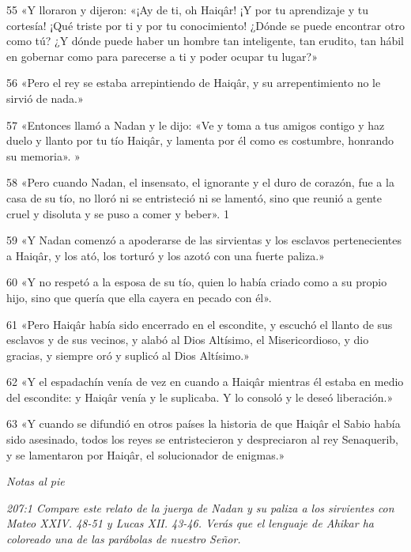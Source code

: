 \par 55 «Y lloraron y dijeron: «¡Ay de ti, oh Haiqâr! ¡Y por tu aprendizaje y tu cortesía! ¡Qué triste por ti y por tu conocimiento! ¿Dónde se puede encontrar otro como tú? ¿Y dónde puede haber un hombre tan inteligente, tan erudito, tan hábil en gobernar como para parecerse a ti y poder ocupar tu lugar?»

\par 56 «Pero el rey se estaba arrepintiendo de Haiqâr, y su arrepentimiento no le sirvió de nada.»

\par 57 «Entonces llamó a Nadan y le dijo: «Ve y toma a tus amigos contigo y haz duelo y llanto por tu tío Haiqâr, y lamenta por él como es costumbre, honrando su memoria». »

\par 58 «Pero cuando Nadan, el insensato, el ignorante y el duro de corazón, fue a la casa de su tío, no lloró ni se entristeció ni se lamentó, sino que reunió a gente cruel y disoluta y se puso a comer y beber». 1

\par 59 «Y Nadan comenzó a apoderarse de las sirvientas y los esclavos pertenecientes a Haiqâr, y los ató, los torturó y los azotó con una fuerte paliza.»

\par 60 «Y no respetó a la esposa de su tío, quien lo había criado como a su propio hijo, sino que quería que ella cayera en pecado con él».

\par 61 «Pero Haiqâr había sido encerrado en el escondite, y escuchó el llanto de sus esclavos y de sus vecinos, y alabó al Dios Altísimo, el Misericordioso, y dio gracias, y siempre oró y suplicó al Dios Altísimo.»

\par 62 «Y el espadachín venía de vez en cuando a Haiqâr mientras él estaba en medio del escondite: y Haiqâr venía y le suplicaba. Y lo consoló y le deseó liberación.»

\par 63 «Y cuando se difundió en otros países la historia de que Haiqâr el Sabio había sido asesinado, todos los reyes se entristecieron y despreciaron al rey Senaquerib, y se lamentaron por Haiqâr, el solucionador de enigmas.»

\par \textit{Notas al pie}

\par \textit{207:1 Compare este relato de la juerga de Nadan y su paliza a los sirvientes con Mateo XXIV. 48-51 y Lucas XII. 43-46. Verás que el lenguaje de Ahikar ha coloreado una de las parábolas de nuestro Señor.}

